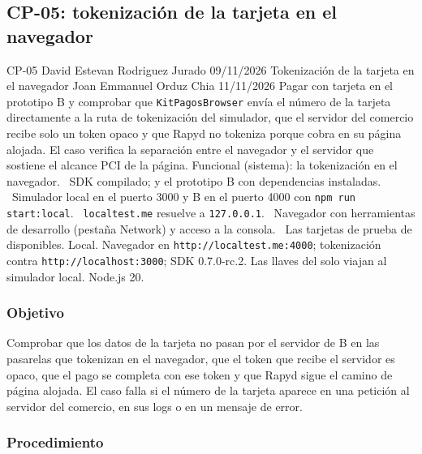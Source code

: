 \subsection{CP-05: tokenización de la tarjeta en el navegador}
\label{sec:cp05}

\FichaCaso
  {CP-05}
  {David Estevan Rodriguez Jurado}
  {09/11/2026}
  {Tokenización de la tarjeta en el navegador}
  {Joan Emmanuel Orduz Chia}
  {11/11/2026}
  {Pagar con tarjeta en el prototipo B y comprobar que \texttt{KitPagosBrowser} envía el número de la tarjeta directamente a la ruta de tokenización del simulador, que el servidor del comercio recibe solo un token opaco y que Rapyd no tokeniza porque cobra en su página alojada. El caso verifica la separación entre el navegador y el servidor que sostiene el alcance PCI de la página.}
  {Funcional (sistema): la tokenización en el navegador.}
  {\textbullet\ SDK compilado;  y el prototipo B con dependencias instaladas.\newline
   \textbullet\ Simulador local en el puerto 3000 y B en el puerto 4000 con \texttt{npm run start:local}.\newline
   \textbullet\ \texttt{localtest.me} resuelve a \texttt{127.0.0.1}.\newline
   \textbullet\ Navegador con herramientas de desarrollo (pestaña Network) y acceso a la consola.\newline
   \textbullet\ Las tarjetas de prueba de  disponibles.}
  {Local. Navegador en \texttt{http://localtest.me:4000}; tokenización contra \texttt{http://localhost:3000}; SDK 0.7.0-rc.2. Las llaves del  solo viajan al simulador local. Node.js 20.}

\subsubsection{Objetivo}

Comprobar que los datos de la tarjeta no pasan por el servidor de B en las pasarelas que tokenizan en el navegador, que el token que recibe el servidor es opaco, que el pago se completa con ese token y que Rapyd sigue el camino de página alojada. El caso falla si el número de la tarjeta aparece en una petición al servidor del comercio, en sus logs o en un mensaje de error.

\subsubsection{Procedimiento}

